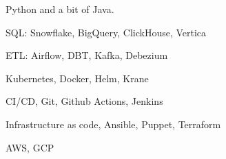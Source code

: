 \item Python and a bit of Java.
\item SQL: Snowflake, BigQuery, ClickHouse, Vertica
\item ETL: Airflow, DBT, Kafka, Debezium
\item Kubernetes, Docker, Helm, Krane
\item CI/CD, Git, Github Actions, Jenkins
\item Infrastructure as code, Ansible, Puppet, Terraform
\item AWS, GCP
